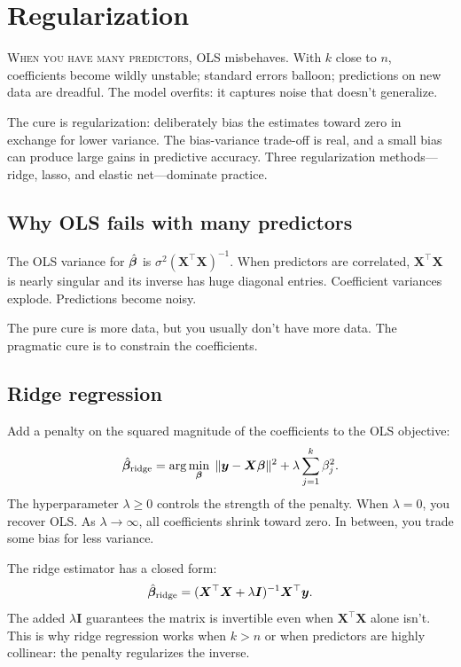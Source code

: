 \chapter{Regularization}
\label{ch:regularization}

\noindent\textsc{When you have many predictors,} OLS misbehaves. With $k$ close to $n$, coefficients become wildly unstable; standard errors balloon; predictions on new data are dreadful. The model overfits: it captures noise that doesn't generalize.

The cure is regularization: deliberately bias the estimates toward zero in exchange for lower variance. The bias-variance trade-off is real, and a small bias can produce large gains in predictive accuracy. Three regularization methods—ridge, lasso, and elastic net—dominate practice.

\section{Why OLS fails with many predictors}

The OLS variance for $\hat{\bm{\beta}}$ is $\sigma^2 (\bm{X}^\top \bm{X})^{-1}$. When predictors are correlated, $\bm{X}^\top \bm{X}$ is nearly singular and its inverse has huge diagonal entries. Coefficient variances explode. Predictions become noisy.

The pure cure is more data, but you usually don't have more data. The pragmatic cure is to constrain the coefficients.

\section{Ridge regression}

Add a penalty on the squared magnitude of the coefficients to the OLS objective:
\begin{equation}
  \hat{\bm{\beta}}_{\text{ridge}} = \arg\min_{\bm{\beta}}\; \|\bm{y} - \bm{X}\bm{\beta}\|^2 + \lambda \sum_{j=1}^{k} \beta_j^2.
  \label{eq:ridge-objective}
\end{equation}
The hyperparameter $\lambda \geq 0$ controls the strength of the penalty. When $\lambda = 0$, you recover OLS. As $\lambda \to \infty$, all coefficients shrink toward zero. In between, you trade some bias for less variance.

The ridge estimator has a closed form:
\begin{equation}
  \hat{\bm{\beta}}_{\text{ridge}} = (\bm{X}^\top \bm{X} + \lambda \bm{I})^{-1} \bm{X}^\top \bm{y}.
  \label{eq:ridge-estimator}
\end{equation}
The added $\lambda \bm{I}$ guarantees the matrix is invertible even when $\bm{X}^\top \bm{X}$ alone isn't. This is why ridge regression works when $k > n$ or when predictors are highly collinear: the penalty regularizes the inverse.

